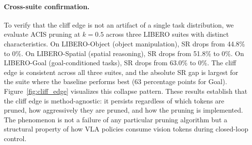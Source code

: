 \paragraph{Cross-suite confirmation.}
To verify that the cliff edge is not an artifact of a single task distribution, we evaluate ACIS pruning at $k{=}0.5$ across three LIBERO suites with distinct characteristics.
On LIBERO-Object (object manipulation), SR drops from 44.8\% to 0\%.
On LIBERO-Spatial (spatial reasoning), SR drops from 51.8\% to 0\%.
On LIBERO-Goal (goal-conditioned tasks), SR drops from 63.0\% to 0\%.
The cliff edge is consistent across all three suites, and the absolute SR gap is largest for the suite where the baseline performs best (63 percentage points for Goal).
Figure~\ref{fig:cliff_edge} visualizes this collapse pattern.
These results establish that the cliff edge is method-agnostic: it persists regardless of which tokens are pruned, how aggressively they are pruned, and how the pruning is implemented.
The phenomenon is not a failure of any particular pruning algorithm but a structural property of how VLA policies consume vision tokens during closed-loop control.
